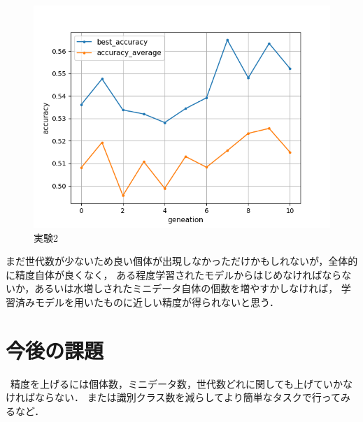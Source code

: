 \documentclass[twocolumn]{ujarticle}     %
\begin{document}
\begin{figure}[b]
	\centering
	\includegraphics[]{figure2.png}
	\caption{実験2\label{fig:exp2}}
\end{figure}

まだ世代数が少ないため良い個体が出現しなかっただけかもしれないが，全体的に精度自体が良くなく，
ある程度学習されたモデルからはじめなければならないか，あるいは水増しされたミニデータ自体の個数を増やすかしなければ，
学習済みモデルを用いたものに近しい精度が得られないと思う．

\section{今後の課題}
\ 精度を上げるには個体数，ミニデータ数，世代数どれに関しても上げていかなければならない．
または識別クラス数を減らしてより簡単なタスクで行ってみるなど．
\end{document}
